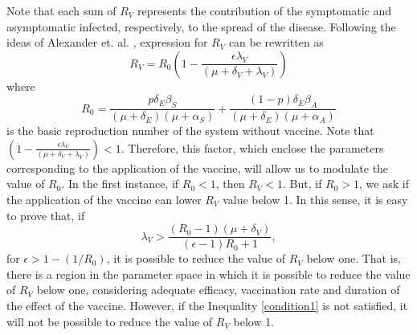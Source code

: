 Note that each sum of $ R_ {V} $ represents the contribution of the symptomatic and
asymptomatic infected, respectively, to the spread of the disease.
Following the ideas of Alexander et. al. \cite{Alexander2004},
expression for $R_V$ can be rewritten as%
\begin{equation}\label{Rv2}
    R_{V} = R_0 \left(1- \frac{\epsilon \lambda_V}{(\mu+\delta_V+\lambda_V)}\right)
\end{equation}
where
\begin{equation}\label{R0}
    R_0 = \frac{p\delta_E\beta_S}{(\mu+\delta_E)(\mu+\alpha_S)} +
    \frac{(1-p) \delta_E \beta_A}{(\mu+\delta_E)(\mu + \alpha_A)}
\end{equation}
is the basic reproduction number of the system without vaccine.
Note that
$\left(1- \frac{\epsilon \lambda_V}{(\mu+\delta_V+\lambda_V)}\right)<1$. Therefore, this
factor, which enclose the  parameters corresponding to the application of the vaccine, will
allow us to modulate the value of $ R_0 $. In the  first instance, if $ R_0 <1 $,
then $ R_V <1 $. But, if $ R_0> 1 $, we ask if the application of the vaccine can
lower $R_V$ value below 1. In this sense, it is easy to prove that, if
\begin{equation}\label{condition1}
    \lambda_V>\frac{(R_0-1)(\mu+\delta_V)}{(\epsilon-1)R_0+1},
\end{equation}
%
for $\epsilon>1-(1/R_0)$, it is possible to reduce the value of $ R_V $ below one.
That is, there is a region in the parameter space in which it is possible to reduce
the value of $ R_V $ below one, considering adequate efficacy, vaccination rate and
duration of the effect of the vaccine. However, if the Inequality
\eqref{condition1} is not satisfied, it will not be possible to reduce the value of
$ R_V $ below 1.

